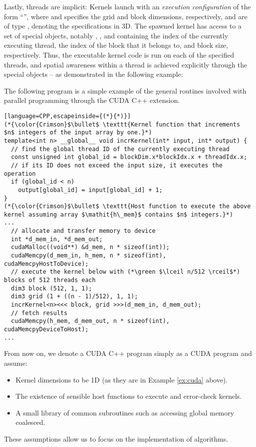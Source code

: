 Lastly, threads are implicit: Kernels launch with an \textit{execution
  configuration} of the form ``'', where
 and  specifies the grid and block dimensions,
respectively, and are of type , denoting the specifications in 3D. The
spawned kernel has access to a set of special objects, notably ,
, and  containing the index of the currently
executing thread, the index of the block that it belongs to, and block size,
respectively. Thus, the executable kernel code is run on each of the specified
threads, and spatial awareness within a thread is achieved explicitly through
the special objects -- as demonstrated in the following example:

\begin{example}\label{ex:cuda}
  The following program is a simple example of the general routines
  involved with parallel programming through the CUDA C++ extension.
\begin{lstlisting}[language=CPP,escapeinside={(*}{*)}]
(*{\color{Crimson}$\bullet$ \texttt{Kernel function that increments $n$ integers of the input array by one.}*)
template<int n> __global__ void incrKernel(int* input, int* output) {
  // find the global thread ID of the currently executing thread
  const unsigned int global_id = blockDim.x*blockIdx.x + threadIdx.x;
  // if its ID does not exceed the input size, it executes the operation
  if (global_id < n)
    output[global_id] = input[global_id] + 1;
}
(*{\color{Crimson}$\bullet$ \texttt{Host function to execute the above kernel assuming array $\mathit{h\_mem}$ contains $n$ integers.}*)
...
  // allocate and transfer memory to device
  int *d_mem_in, *d_mem_out;
  cudaMalloc((void**) &d_mem, n * sizeof(int));
  cudaMemcpy(d_mem_in, h_mem, n * sizeof(int), cudaMemcpyHostToDevice);
  // execute the kernel below with (*\green $\lceil n/512 \rceil$*) blocks of 512 threads each
  dim3 block (512, 1, 1);
  dim3 grid (1 + ((n - 1)/512), 1, 1);
  incrKernel<n><<< block, grid >>>(d_mem_in, d_mem_out);
  // fetch results
  cudaMemcpy(h_mem, d_mem_out, n * sizeof(int), cudaMemcpyDeviceToHost);
...
\end{lstlisting}
\end{example}

From now on, we denote a CUDA C++ program simply as a CUDA program and assume:
\begin{itemize}
  \renewcommand\labelitemi{--}
\item Kernel dimensions to be 1D (as they are in Example \ref{ex:cuda} above).
\item The existence of sensible host functions to execute and error-check
  kernels.
\item A small library of common subroutines such as accessing global memory
  coalesced.
\end{itemize}
These assumptions allow us to focus on the implementation of algorithms.

